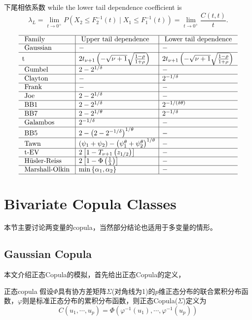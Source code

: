 \documentclass[12pt]{article}
\theoremstyle{definition}
\begin{document}
\begin{sdefinition}{下尾相依系数}{}
while the lower tail dependence coefficient is
$$
\lambda_L=\lim _{t \rightarrow 0^{+}} P\left(X_2 \leq F_2^{-1}(t) \mid X_1 \leq F_1^{-1}(t)\right)=\lim _{t \rightarrow 0^{+}} \frac{C(t, t)}{t} .
$$
\end{sdefinition}
$$
\begin{array}{l|l|l}
\hline \text { Family } & \text { Upper tail dependence } & \text { Lower tail dependence } \\
\hline \text { Gaussian } & - & - \\
\hline \mathrm{t} & 2 t_{\nu+1}\left(-\sqrt{\nu+1} \sqrt{\frac{1-\rho}{1+\rho}}\right) & 2 t_{\nu+1}\left(-\sqrt{\nu+1} \sqrt{\frac{1-\rho}{1+\rho}}\right) \\
\hline \text { Gumbel } & 2-2^{1 / \delta} & - \\
\hline \text { Clayton } & - & 2^{-1 / \delta} \\
\hline \text { Frank } & - & - \\
\hline \text { Joe } & 2-2^{1 / \delta} & - \\
\hline \text { BB1 } & 2-2^{1 / \delta} & 2^{-1 /(\delta \theta)} \\
\hline \text { BB7 } & 2-2^{1 / \theta} & 2^{-1 / \delta} \\
\hline \text { Galambos } & 2^{-1 / \delta} & - \\
\hline \text { BB5 } & 2-\left(2-2^{-1 / \delta}\right)^{1 / \theta} & - \\
\hline \text { Tawn } & \left(\psi_1+\psi_2\right)-\left(\psi_1^\theta+\psi_2^\theta\right)^{1 / \theta} & - \\
\hline \text { t-EV } & 2\left[1-T_{\nu+1}\left(z_{1 / 2}\right)\right] & - \\
\hline \text { Hüsler-Reiss } & 2\left[1-\Phi\left(\frac{1}{\lambda}\right)\right] & - \\
\hline \text { Marshall-Olkin } & \min \left\{\alpha_1, \alpha_2\right\} & - \\
\hline
\end{array}
$$
\section{Bivariate Copula Classes}
本节主要讨论两变量的copula，当然部分结论也适用于多变量的情形。
\subsection{Gaussian Copula}
本文介绍正态Copula的模拟，首先给出正态Copula的定义，
\begin{sdefinition}{正态copula}{}
假设$\Phi$具有协方差矩阵$\Sigma$(对角线为1)的$p$维正态分布的联合累积分布函数，$\varphi$则是标准正态分布的累积分布函数，则正态Copula($\Sigma$)定义为
$$
C(u_1,\cdots,u_p) = \Phi(\varphi^{-1}(u_1),\cdots,\varphi^{-1}(u_p))
$$
\end{sdefinition}
\end{document}
